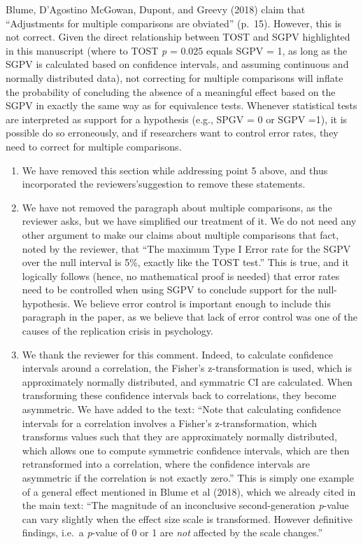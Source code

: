 \documentclass[man]{apa6}
\begin{document}
Blume, D'Agostino McGowan, Dupont, and Greevy (2018) claim that \enquote{Adjustments for multiple comparisons are obviated} (p.~15). However, this is not correct. Given the direct relationship between TOST and SGPV highlighted in this manuscript (where to TOST \emph{p} = 0.025 equals SGPV = 1, as long as the SGPV is calculated based on confidence intervals, and assuming continuous and normally distributed data), not correcting for multiple comparisons will inflate the probability of concluding the absence of a meaningful effect based on the SGPV in exactly the same way as for equivalence tests. Whenever statistical tests are interpreted as support for a hypothesis (e.g., SPGV = 0 or SGPV =1), it is possible do so erroneously, and if researchers want to control error rates, they need to correct for multiple comparisons.

\begin{enumerate}
\def\labelenumi{\arabic{enumi}.}
\setcounter{enumi}{5}
\item
  We have removed this section while addressing point 5 above, and thus incorporated the reviewers'suggestion to remove these statements.
\item
  We have not removed the paragraph about multiple comparisons, as the reviewer asks, but we have simplified our treatment of it. We do not need any other argument to make our claims about multiple comparisons that fact, noted by the reviewer, that \enquote{The maximum Type I Error rate for the SGPV over the null interval is 5\%, exactly like the TOST test.} This is true, and it logically follows (hence, no mathematical proof is needed) that error rates need to be controlled when using SGPV to conclude support for the null-hypothesis. We believe error control is important enough to include this paragraph in the paper, as we believe that lack of error control was one of the causes of the replication crisis in psychology.
\item
  We thank the reviewer for this comment. Indeed, to calculate confidence intervals around a correlation, the Fisher's z-transformation is used, which is approximately normally distributed, and symmatric CI are calculated. When transforming these confidence intervals back to correlations, they become asymmetric. We have added to the text: \enquote{Note that calculating confidence intervals for a correlation involves a Fisher's z-transformation, which transforms values such that they are approximately normally distributed, which allows one to compute symmetric confidence intervals, which are then retransformed into a correlation, where the confidence intervals are asymmetric if the correlation is not exactly zero.} This is simply one example of a general effect mentioned in Blume et al (2018), which we already cited in the main text: \enquote{The magnitude of an inconclusive second-generation \emph{p}-value can vary slightly when the effect size scale is transformed. However definitive findings, i.e.~a \emph{p}-value of 0 or 1 are \emph{not} affected by the scale changes.}
\end{enumerate}
\end{document}
